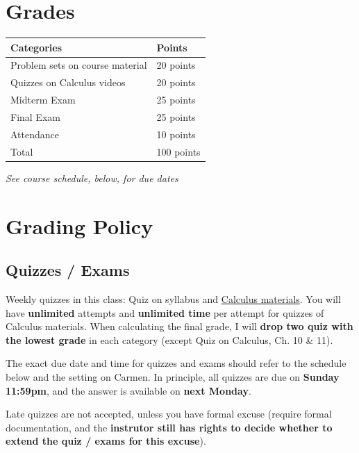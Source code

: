 \documentclass[12pt]{article}
\begin{document}
\newpage

\section*{Grades}

\newlength\q
\setlength{}
\newlength\y
\setlength{}
\begin{center}
\begin{tabular}{|p{\q}|p{\q}|}
    \hline
    Categories  & Points \\
    \hline
    \hline
    Problem sets on course material   & 20 points \\
    \hline
    Quizzes on Calculus videos & 20 points \\
    \hline
    Midterm Exam & 25 points \\
    \hline
    Final Exam & 25 points \\
    \hline
    Attendance & 10 points \\
    \hline
    Total & 100 points \\
    \hline
\end{tabular}
\end{center}

\textit{See course schedule, below, for due dates}


\section*{Grading Policy}

\subsection*{Quizzes / Exams}

Weekly quizzes in this class: Quiz on syllabus and \underline{Calculus materials}.
You will have \textbf{unlimited} attempts and \textbf{unlimited time} per attempt for quizzes of Calculus materials.
When calculating the final grade, I will \textbf{drop two quiz with the lowest grade} in each category (except Quiz on Calculus, Ch. 10 \& 11).

The exact due date and time for quizzes and exams should refer to the schedule below and the setting on Carmen.
In principle, all quizzes are due on \textbf{Sunday 11:59pm}, and the answer is available on \textbf{next Monday}.

Late quizzes are not accepted, unless you have formal excuse (require formal documentation, and the \textbf{instrutor still has rights to decide whether to extend the quiz / exams for this excuse}).
\end{document}
